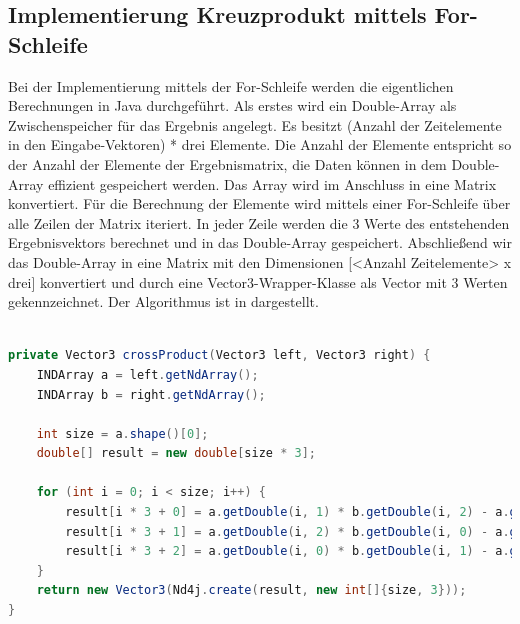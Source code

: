 \subsection{Implementierung Kreuzprodukt mittels For-Schleife}
Bei der Implementierung mittels der For-Schleife werden die eigentlichen Berechnungen in Java durchgeführt.
Als erstes wird ein Double-Array als Zwischenspeicher für das Ergebnis angelegt.
Es besitzt (Anzahl der Zeitelemente in den Eingabe-Vektoren) * drei Elemente.
Die Anzahl der Elemente entspricht so der Anzahl der Elemente der Ergebnismatrix, die Daten können in dem Double-Array effizient gespeichert werden.
Das Array wird im Anschluss in eine Matrix konvertiert.
Für die Berechnung der Elemente wird mittels einer For-Schleife über alle Zeilen der Matrix iteriert.
In jeder Zeile werden die 3 Werte des entstehenden Ergebnisvektors berechnet und in das Double-Array gespeichert.
Abschließend wir das Double-Array in eine Matrix mit den Dimensionen [<Anzahl Zeitelemente> x drei] konvertiert und durch eine Vector3-Wrapper-Klasse als Vector mit 3 Werten gekennzeichnet.
Der Algorithmus ist in  dargestellt.
\\\\
\begin{minipage}{\linewidth}
\begin{lstlisting}[language=java, label={lst:Kreuzprodukt_For}, caption={Implementierung Kreuzprodukt mittels for-Schleife}, captionpos=b]
private Vector3 crossProduct(Vector3 left, Vector3 right) {
    INDArray a = left.getNdArray();
    INDArray b = right.getNdArray();

    int size = a.shape()[0];
    double[] result = new double[size * 3];

    for (int i = 0; i < size; i++) {
        result[i * 3 + 0] = a.getDouble(i, 1) * b.getDouble(i, 2) - a.getDouble(i, 2) * b.getDouble(i, 1);
        result[i * 3 + 1] = a.getDouble(i, 2) * b.getDouble(i, 0) - a.getDouble(i, 0) * b.getDouble(i, 2);
        result[i * 3 + 2] = a.getDouble(i, 0) * b.getDouble(i, 1) - a.getDouble(i, 1) * b.getDouble(i, 0);
    }
    return new Vector3(Nd4j.create(result, new int[]{size, 3}));
}
\end{lstlisting}
\end{minipage}

